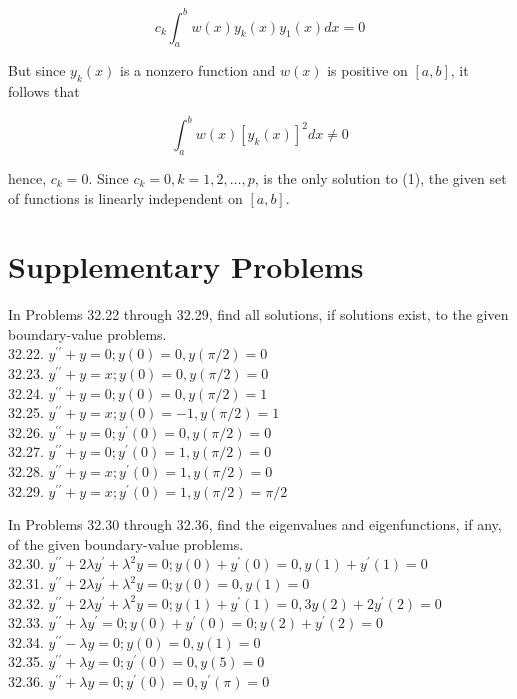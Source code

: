 \documentclass[10pt]{article}
\begin{document}
$$
c_{k} \int_{a}^{b} w(x) y_{k}(x) y_{1}(x) d x=0
$$

But since $y_{k}(x)$ is a nonzero function and $w(x)$ is positive on $[a, b]$, it follows that

$$
\int_{a}^{b} w(x)\left[y_{k}(x)\right]^{2} d x \neq 0
$$

hence, $c_{k}=0$. Since $c_{k}=0, k=1,2, \ldots, p$, is the only solution to (1), the given set of functions is linearly independent on $[a, b]$.

\section*{Supplementary Problems}
In Problems 32.22 through 32.29, find all solutions, if solutions exist, to the given boundary-value problems.\\
32.22. $y^{\prime \prime}+y=0 ; y(0)=0, y(\pi / 2)=0$\\
32.23. $y^{\prime \prime}+y=x ; y(0)=0, y(\pi / 2)=0$\\
32.24. $y^{\prime \prime}+y=0 ; y(0)=0, y(\pi / 2)=1$\\
32.25. $y^{\prime \prime}+y=x ; y(0)=-1, y(\pi / 2)=1$\\
32.26. $y^{\prime \prime}+y=0 ; y^{\prime}(0)=0, y(\pi / 2)=0$\\
32.27. $y^{\prime \prime}+y=0 ; y^{\prime}(0)=1, y(\pi / 2)=0$\\
32.28. $y^{\prime \prime}+y=x ; y^{\prime}(0)=1, y(\pi / 2)=0$\\
32.29. $y^{\prime \prime}+y=x ; y^{\prime}(0)=1, y(\pi / 2)=\pi / 2$

In Problems 32.30 through 32.36, find the eigenvalues and eigenfunctions, if any, of the given boundary-value problems.\\
32.30. $y^{\prime \prime}+2 \lambda y^{\prime}+\lambda^{2} y=0 ; y(0)+y^{\prime}(0)=0, y(1)+y^{\prime}(1)=0$\\
32.31. $y^{\prime \prime}+2 \lambda y^{\prime}+\lambda^{2} y=0 ; y(0)=0, y(1)=0$\\
32.32. $y^{\prime \prime}+2 \lambda y^{\prime}+\lambda^{2} y=0 ; y(1)+y^{\prime}(1)=0,3 y(2)+2 y^{\prime}(2)=0$\\
32.33. $y^{\prime \prime}+\lambda y^{\prime}=0 ; y(0)+y^{\prime}(0)=0 ; y(2)+y^{\prime}(2)=0$\\
32.34. $y^{\prime \prime}-\lambda y=0 ; y(0)=0, y(1)=0$\\
32.35. $y^{\prime \prime}+\lambda y=0 ; y^{\prime}(0)=0, y(5)=0$\\
32.36. $y^{\prime \prime}+\lambda y=0 ; y^{\prime}(0)=0, y^{\prime}(\pi)=0$
\end{document}
